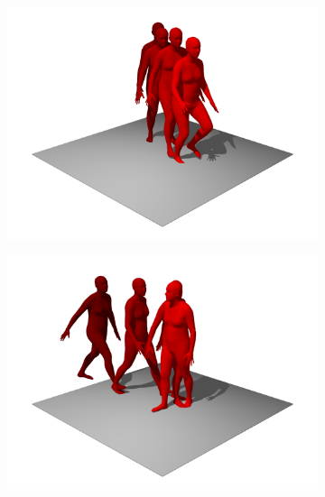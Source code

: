 \begin{figure}
    \centering
    \begin{subfigure}{0.32\linewidth}
        \includegraphics[width=\linewidth]{figures/results/single-falls1.png}
    \end{subfigure}
    \hfill
    \begin{subfigure}{0.32\linewidth}
        \includegraphics[width=\linewidth]{figures/results/single-falls2.png}
    \end{subfigure}
    \hfill
    \begin{subfigure}{0.32\linewidth}

\end{subfigure}
\end{figure}
